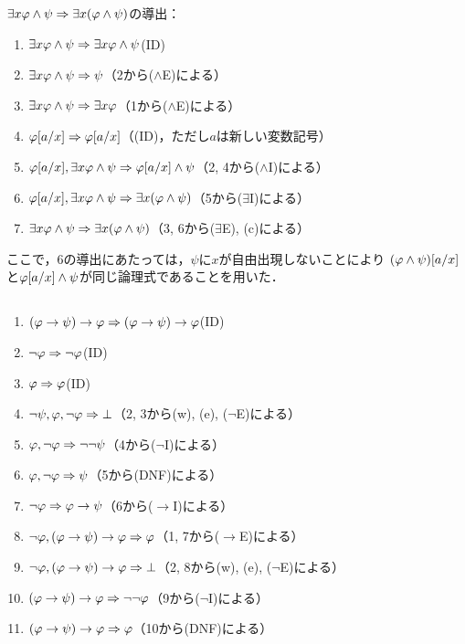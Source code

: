 \(\exists x \varphi \land \psi \sequent \exists x \paren{\varphi \land \psi}\)の導出：
\begin{enumerate}
	\item \(\exists x \varphi \land \psi \Rightarrow \exists x \varphi \land \psi\)\quad (ID)
	\item \(\exists x \varphi \land \psi \Rightarrow \psi\)\quad （2から(\(\land\)E)による）
	\item \(\exists x \varphi \land \psi \Rightarrow \exists x \varphi\)\quad （1から(\(\land\)E)による）
	\item \(\subst{\varphi}{a/x} \sequent \subst{\varphi}{a/x}\)\quad （(ID)，ただし\(a\)は新しい変数記号）
	\item \(\subst{\varphi}{a/x}, \exists x \varphi \land \psi \sequent \subst{\varphi}{a/x} \land \psi\)\quad （2, 4から(\(\land\)I)による）
	\item \(\subst{\varphi}{a/x}, \exists x \varphi \land \psi \sequent \exists x \paren{\varphi \land \psi}\)\quad （5から(\(\exists\)I)による）
	\item \(\exists x \varphi \land \psi \sequent \exists x \paren{\varphi \land \psi}\)\quad （3, 6から(\(\exists\)E), (c)による）
\end{enumerate}
ここで，6の導出にあたっては，\(\psi\)に\(x\)が自由出現しないことにより
\(\subst{\paren{\varphi \land \psi}}{a/x}\)と\(\subst{\varphi}{a/x} \land \psi\)が同じ論理式であることを用いた．


\subsection*{}

\begin{enumerate}
	\item \(\paren{\varphi \to \psi} \to \varphi \sequent \paren{\varphi \to \psi} \to \varphi\)\quad (ID)
	\item \(\lnot \varphi \Rightarrow \lnot \varphi\)\quad (ID)
	\item \(\varphi \Rightarrow \varphi\)\quad (ID)
	\item \(\lnot \psi, \varphi, \lnot \varphi \Rightarrow \bot\)\quad （2, 3から(w), (e), (\(\lnot\)E)による）
	\item \(\varphi, \lnot \varphi \Rightarrow \lnot \lnot \psi\)\quad （4から(\(\lnot\)I)による）
	\item \(\varphi, \lnot \varphi \Rightarrow \psi\)\quad （5から(DNF)による）
	\item \(\lnot \varphi \Rightarrow \varphi \to \psi\)\quad （6から(\(\to\)I)による）
	\item \(\lnot \varphi, \paren{\varphi \to \psi} \to \varphi \sequent \varphi\)\quad （1, 7から(\(\to\)E)による）
	\item \(\lnot \varphi, \paren{\varphi \to \psi} \to \varphi \sequent \bot\)\quad （2, 8から(w), (e), (\(\lnot\)E)による）
	\item \(\paren{\varphi \to \psi} \to \varphi \sequent \lnot \lnot \varphi\)\quad （9から(\(\lnot\)I)による）
	\item \(\paren{\varphi \to \psi} \to \varphi \sequent \varphi\)\quad （10から(DNF)による）
\end{enumerate}


